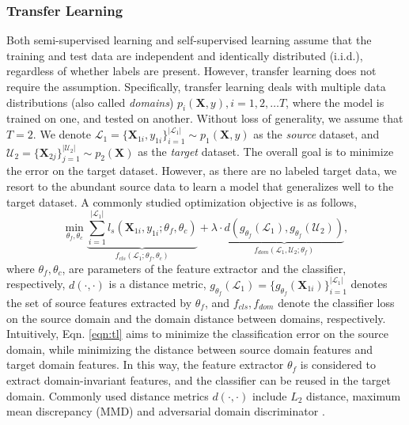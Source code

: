 \documentclass[11pt]{article}
\begin{document}
\subsubsection{Transfer Learning}\label{sec:prelim-unsup-trans}
Both semi-supervised learning and self-supervised learning assume that the training and test data are independent and identically distributed (i.i.d.), regardless of whether labels are present. However, transfer learning \cite{pan2010survey} does not require the assumption. Specifically, transfer learning deals with multiple data distributions (also called \textit{domains}) $p_i(\mathbf{X}, y), i=1, 2, \dots T$, where the model is trained on one, and tested on another. Without loss of generality, we assume that $T=2$. We denote $\mathcal{L}_1=\{\mathbf{X}_{1i}, y_{1i}\}_{i=1}^{|\mathcal{L}_1|}\sim p_1(\mathbf{X}, y)$ as the \textit{source} dataset, and $\mathcal{U}_2=\{\mathbf{X}_{2j}\}_{j=1}^{|\mathcal{U}_2|}\sim p_2(\mathbf{X})$ as the \textit{target} dataset. The overall goal is to minimize the error on the target dataset. However, as there are no labeled target data, we resort to the abundant source data to learn a model that generalizes well to the target dataset. A commonly studied optimization objective is as follows, 
\begin{equation}
    \min_{\theta_{f}, \theta_c}  \underbrace{\sum_{i=1}^{|\mathcal{L}_1|}l_s(\mathbf{X}_{1i}, y_{1i}; \theta_f, \theta_c)}_{f_{cls}(\mathcal{L}_1;\theta_f, \theta_c)} + \lambda\cdot \underbrace{d\left(g_{\theta_f}\left(\mathcal{L}_1\right), g_{\theta_f}\left(\mathcal{U}_2\right)\right)}_{f_{dom}({\mathcal{L}_1, \mathcal{U}_2};\theta_f)},
    \label{eqn:tl}
\end{equation}
where $\theta_f, \theta_c$, are parameters of the feature extractor and the classifier, respectively, $d(\cdot, \cdot)$ is a distance metric, $g_{\theta_f}(\mathcal{L}_1) = \{g_{\theta_f}(\mathbf{X}_{1i})\}_{i=1}^{|\mathcal{L}_1|}$ denotes the set of source features extracted by $\theta_f$, and $f_{cls}, f_{dom}$ denote the classifier loss on the source domain and the domain distance between domains, respectively. Intuitively, Eqn. \ref{eqn:tl} aims to minimize the classification error on the source domain, while minimizing the distance between source domain features and target domain features. In this way, the feature extractor $\theta_f$ is considered to extract domain-invariant features, and the classifier can be reused in the target domain. Commonly used distance metrics $d(\cdot, \cdot)$ include $L_2$ distance, maximum mean discrepancy (MMD) \cite{long2015learning} and adversarial domain discriminator \cite{ganin2016domain}. 
\end{document}
